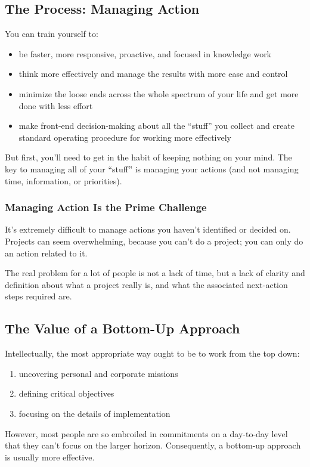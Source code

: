 \documentclass[letterpaper]{article}
\newcommand{\p}{\vspace{1em}\par}		%
\begin{document}
\subsection{The Process: Managing Action}
You can train yourself to:
\begin{itemize}
\item be faster, more responsive, proactive, and focused in knowledge work
\item think more effectively and manage the results with more ease and control
\item minimize the loose ends across the whole spectrum of your life and get more done with less effort
\item make front-end decision-making about all the ``stuff'' you collect and create standard operating procedure for working more effectively
\end{itemize}
But first, you'll need to get in the habit of keeping nothing on your mind. The key to managing all of your ``stuff'' is managing your actions (and not managing time, information, or priorities).

\subsubsection*{Managing Action Is the Prime Challenge}
It's extremely difficult to manage actions you haven't identified or decided on. Projects can seem overwhelming, because you can't do a project; you can only do an action related to it.

\p The real problem for a lot of people is not a lack of time, but a lack of clarity and definition about what a project really is, and what the associated next-action steps required are.

\subsection*{The Value of a Bottom-Up Approach}
Intellectually, the most appropriate way ought to be to work from the top down:
\begin{enumerate}
\item uncovering personal and corporate missions
\item defining critical objectives
\item focusing on the details of implementation
\end{enumerate}
However, most people are so embroiled in commitments on a day-to-day level that they can't focus on the larger horizon. Consequently, a bottom-up approach is usually more effective.
\end{document}

